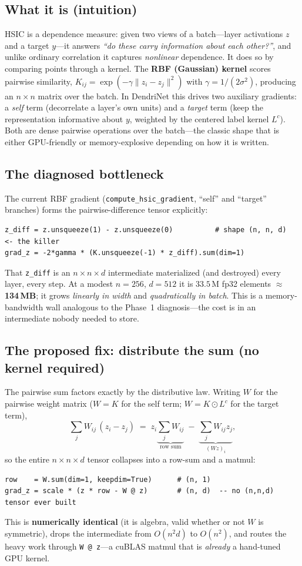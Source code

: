 \documentclass[11pt]{article}
\begin{document}
\subsection*{What it is (intuition)}
HSIC is a dependence measure: given two views of a batch---layer activations $z$ and a target $y$---it
answers \emph{``do these carry information about each other?''}, and unlike ordinary correlation it
captures \emph{nonlinear} dependence. It does so by comparing points through a kernel. The
\textbf{RBF (Gaussian) kernel} scores pairwise similarity,
$K_{ij}=\exp(-\gamma\lVert z_i-z_j\rVert^2)$ with $\gamma=1/(2\sigma^2)$, producing an $n\times n$
matrix over the batch. In DendriNet this drives two auxiliary gradients: a \emph{self} term
(decorrelate a layer's own units) and a \emph{target} term (keep the representation informative
about $y$, weighted by the centered label kernel $L^c$). Both are dense pairwise operations over
the batch---the classic shape that is either GPU-friendly or memory-explosive depending on how it
is written.

\subsection*{The diagnosed bottleneck}
The current RBF gradient (\texttt{compute\_hsic\_gradient}, ``self'' and ``target'' branches) forms
the pairwise-difference tensor explicitly:
\begin{verbatim}
z_diff = z.unsqueeze(1) - z.unsqueeze(0)          # shape (n, n, d)  <- the killer
grad_z = -2*gamma * (K.unsqueeze(-1) * z_diff).sum(dim=1)
\end{verbatim}
That \texttt{z\_diff} is an $n\times n\times d$ intermediate materialized (and destroyed) every layer,
every step. At a modest $n{=}256$, $d{=}512$ it is $33.5$\,M fp32 elements $\approx$
\textbf{134\,MB}; it grows \emph{linearly in width} and \emph{quadratically in batch}. This is a
memory-bandwidth wall analogous to the Phase~1 diagnosis---the cost is in an intermediate nobody
needed to store.

\subsection*{The proposed fix: distribute the sum (no kernel required)}
The pairwise sum factors exactly by the distributive law. Writing $W$ for the pairwise weight
matrix ($W=K$ for the self term; $W=K\odot L^c$ for the target term),
\[
\sum_j W_{ij}\,(z_i - z_j)
\;=\; z_i \underbrace{\textstyle\sum_j W_{ij}}_{\text{row sum}}
\;-\; \underbrace{\textstyle\sum_j W_{ij} z_j}_{(Wz)_i},
\]
so the entire $n\times n\times d$ tensor collapses into a row-sum and a matmul:
\begin{verbatim}
row    = W.sum(dim=1, keepdim=True)      # (n, 1)
grad_z = scale * (z * row - W @ z)       # (n, d)  -- no (n,n,d) tensor ever built
\end{verbatim}
This is \textbf{numerically identical} (it is algebra, valid whether or not $W$ is symmetric), drops
the intermediate from $O(n^2 d)$ to $O(n^2)$, and routes the heavy work through \texttt{W @ z}---a
cuBLAS matmul that is \emph{already} a hand-tuned GPU kernel.
\end{document}
